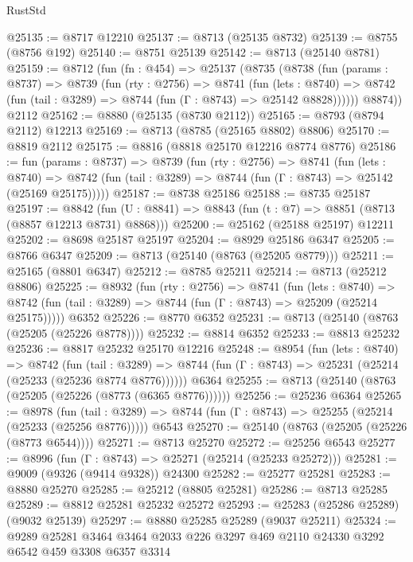 \begin{lexlean}{RustStd}
\begin{coremodule}
@25135 := @8717 @12210
@25137 := @8713 (@25135 @8732)
@25139 := @8755 (@8756 @192)
@25140 := @8751 @25139
@25142 := @8713 (@25140 @8781)
@25159 := @8712
    (fun (fn : @454) =>
    @25137
      (@8735
        (@8738
          (fun (params : @8737) =>
          @8739
            (fun (rty : @2756) =>
            @8741
              (fun (lets : @8740) =>
              @8742 (fun (tail : @3289) => @8744 (fun (Γ : @8743) => @25142 @8828))))))
        @8874))
    @2112
@25162 := @8880 (@25135 (@8730 @2112))
@25165 := @8793 (@8794 @2112) @12213
@25169 := @8713 (@8785 (@25165 @8802) @8806)
@25170 := @8819 @2112
@25175 := @8816 (@8818 @25170 @12216 @8774 @8776)
@25186 := fun (params : @8737) =>
  @8739
    (fun (rty : @2756) =>
    @8741
      (fun (lets : @8740) =>
      @8742 (fun (tail : @3289) => @8744 (fun (Γ : @8743) => @25142 (@25169 @25175)))))
@25187 := @8738 @25186
@25188 := @8735 @25187
@25197 := @8842
    (fun (U : @8841) => @8843 (fun (t : @7) => @8851 (@8713 (@8857 @12213 @8731) @8868)))
@25200 := @25162 (@25188 @25197) @12211
@25202 := @8698 @25187 @25197
@25204 := @8929 @25186 @6347
@25205 := @8766 @6347
@25209 := @8713 (@25140 (@8763 (@25205 @8779)))
@25211 := @25165 (@8801 @6347)
@25212 := @8785 @25211
@25214 := @8713 (@25212 @8806)
@25225 := @8932
    (fun (rty : @2756) =>
    @8741
      (fun (lets : @8740) =>
      @8742 (fun (tail : @3289) => @8744 (fun (Γ : @8743) => @25209 (@25214 @25175)))))
    @6352
@25226 := @8770 @6352
@25231 := @8713 (@25140 (@8763 (@25205 (@25226 @8778))))
@25232 := @8814 @6352
@25233 := @8813 @25232
@25236 := @8817 @25232 @25170 @12216
@25248 := @8954
    (fun (lets : @8740) =>
    @8742
      (fun (tail : @3289) =>
      @8744 (fun (Γ : @8743) => @25231 (@25214 (@25233 (@25236 @8774 @8776))))))
    @6364
@25255 := @8713 (@25140 (@8763 (@25205 (@25226 (@8773 (@6365 @8776))))))
@25256 := @25236 @6364
@25265 := @8978
    (fun (tail : @3289) => @8744 (fun (Γ : @8743) => @25255 (@25214 (@25233 (@25256 @8776)))))
    @6543
@25270 := @25140 (@8763 (@25205 (@25226 (@8773 @6544))))
@25271 := @8713 @25270
@25272 := @25256 @6543
@25277 := @8996 (fun (Γ : @8743) => @25271 (@25214 (@25233 @25272)))
@25281 := @9009 (@9326 (@9414 @9328)) @24300
@25282 := @25277 @25281
@25283 := @8880 @25270
@25285 := @25212 (@8805 @25281)
@25286 := @8713 @25285
@25289 := @8812 @25281 @25232 @25272
@25293 := @25283 (@25286 @25289) (@9032 @25139)
@25297 := @8880 @25285 @25289 (@9037 @25211)
@25324 := @9289
    @25281
    @3464
    @3464
    @2033
    @226
    @3297
    @469
    @2110
    @24330
    @3292
    @6542
    @459
    @3308
    @6357
    @3314

\end{coremodule}
\end{lexlean}
